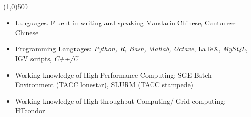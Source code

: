 \documentclass[dvips,11pt]{article}
\begin{document}
 \vspace{-2mm}
\\\noindent
\vspace{-7mm}
\line(1,0){500}\\

\begin{itemize} \itemsep 1pt \parskip 0pt \parsep 0pt
	\setlength{\itemsep}{0pt}
	\item	Languages: Fluent in writing and speaking Mandarin Chinese, Cantonese Chinese
	\item	Programming Languages: {\it Python, R, Bash, Matlab, Octave}, \LaTeX, {\it MySQL}, IGV scripts, {\it C++/C}
	\item Working knowledge of High Performance Computing: SGE Batch Environment (TACC lonestar), SLURM (TACC stampede)
	\item Working knowledge of High throughput Computing/ Grid computing: HTcondor
\end{itemize}
\end{document}
